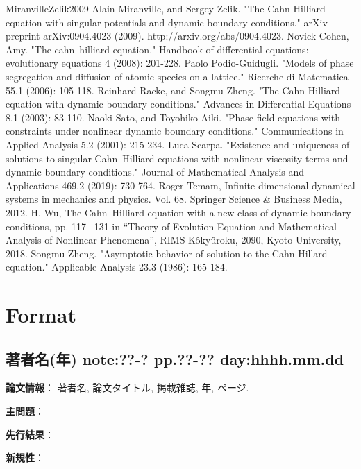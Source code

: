\documentclass[a4paper]{jsarticle}
\begin{document}
\begin{thebibliography}{99}
	\item{MiranvilleZelik2009}
		Alain Miranville, and Sergey Zelik. "The Cahn-Hilliard equation with singular potentials and dynamic boundary conditions." arXiv preprint arXiv:0904.4023 (2009).
		http://arxiv.org/abs/0904.4023.
		Novick-Cohen, Amy. "The cahn–hilliard equation." Handbook of differential equations: evolutionary equations 4 (2008): 201-228.
		Paolo Podio-Guidugli. "Models of phase segregation and diffusion of atomic species on a lattice." Ricerche di Matematica 55.1 (2006): 105-118.
		Reinhard Racke, and Songmu Zheng. "The Cahn-Hilliard equation with dynamic boundary conditions." Advances in Differential Equations 8.1 (2003): 83-110.
		Naoki Sato, and Toyohiko Aiki. "Phase field equations with constraints under nonlinear dynamic boundary conditions." Communications in Applied Analysis 5.2 (2001): 215-234.
		Luca Scarpa. "Existence and uniqueness of solutions to singular Cahn–Hilliard equations with nonlinear viscosity terms and dynamic boundary conditions." Journal of Mathematical Analysis and Applications 469.2 (2019): 730-764.
		Roger Temam, Infinite-dimensional dynamical systems in mechanics and physics. Vol. 68. Springer Science \& Business Media, 2012.
		H. Wu, The Cahn–Hilliard equation with a new class of dynamic boundary conditions, pp. 117– 131 in “Theory of Evolution Equation and Mathematical Analysis of Nonlinear Phenomena”, RIMS K\^oky\^uroku, 2090, Kyoto University, 2018.
		Songmu Zheng. "Asymptotic behavior of solution to the Cahn-Hillard equation." Applicable Analysis 23.3 (1986): 165-184.
\end{thebibliography}

\appendix

\section{Format}

\subsection{著者名(年) note:??-? pp.??-?? day:hhhh.mm.dd}
{\bf 論文情報}：
著者名, 論文タイトル, 掲載雑誌, 年, ページ.

{\bf 主問題}：

{\bf 先行結果}：

{\bf 新規性}：
\end{document}
